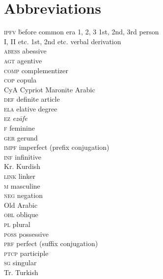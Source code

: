\documentclass[output=paper]{langsci/langscibook}
\begin{document}
\section*{Abbreviations}
\begin{multicols}{2}
\begin{tabbing}
\textsc{ipfv} \hspace{1.5em} \= before common era\kill
\textsc{1, 2, 3} \> 1st, 2nd, 3rd person \\
I, II etc. \> 1st, 2nd etc. verbal {derivation} \\
\textsc{abess} \> abessive \\
\textsc{agt} \> agentive \\
\textsc{comp} \> {complementizer} \\
\textsc{cop} \> {copula} \\
CyA \> Cypriot Maronite Arabic \\
\textsc{def} \> {definite} {article} \\
\textsc{ela} \> {elative} degree \\
\textsc{ez} \> \textit{ezāfe} \\
\textsc{f} \> feminine \\
\textsc{ger} \> gerund \\
\textsc{impf} \> imperfect (prefix conjugation) \\
\textsc{inf} \> {infinitive} \\
Kr. \> Kurdish \\
\textsc{link} \> linker \\
\textsc{m} \> masculine \\
\textsc{neg} \> {negation}  \\
 \> Old Arabic \\
\textsc{obl} \> oblique \\
\textsc{pl} \> plural \\
\textsc{poss} \> possessive  \\
\textsc{prf} \> perfect (suffix conjugation) \\
\textsc{ptcp} \> {participle} \\
\textsc{sg} \> singular \\
Tr. \> Turkish
\end{tabbing}
\end{multicols}

{\sloppy\printbibliography[heading=subbibliography,notkeyword=this]}
\end{document}
